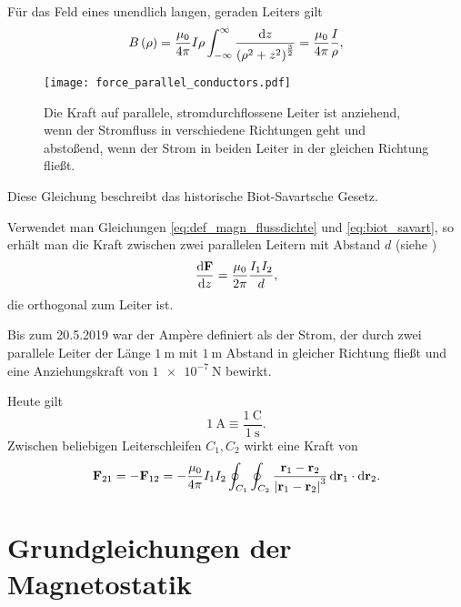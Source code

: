 Für das Feld eines unendlich langen, geraden Leiters gilt
\begin{equation}
	\label{eq:biot_savart}
	B\left(\rho \right)=\frac{\mu _{0}}{4\pi }I\rho \int _{-\infty }^{\infty }\frac{\mathop{}\!\mathrm{d} z}{\left(\rho ^{2}+z^{2}\right)^{\frac{3}{2}}}=\frac{\mu _{0}}{4\pi }\frac{I}{\rho },
\end{equation}


\begin{figure}[htb]
	\centering
	\texttt{[image: force\_parallel\_conductors.pdf]}
	\caption{Die Kraft auf parallele, stromdurchflossene Leiter ist anziehend, wenn der Stromfluss in verschiedene Richtungen geht und abstoßend, wenn der Strom in beiden Leiter in der gleichen Richtung fließt. }
	\label{fig:force_parallel_conductors}
\end{figure}

Diese Gleichung beschreibt das historische Biot-Savartsche Gesetz.

Verwendet man Gleichungen \eqref{eq:def_magn_flussdichte} und \eqref{eq:biot_savart}, so erhält man die Kraft zwischen zwei parallelen Leitern mit Abstand $d$ (siehe )
\begin{equation*}
	\frac{\mathop{}\!\mathrm{d}\mathbf{F}}{\mathop{}\!\mathrm{d} z} = \frac{\mu_0}{2\pi} \frac{I_1I_2}d,
\end{equation*}
die orthogonal zum Leiter ist.

Bis zum 20.5.2019 war der Ampère definiert als der Strom, der durch zwei parallele Leiter der Länge $\SI{1}{\m}$ mit $\SI{1}{\m}$ Abstand in gleicher Richtung fließt und eine Anziehungskraft von $\SI{1e-7}{\newton}$ bewirkt.

Heute gilt
\begin{equation*}
	\SI{1}{\ampere}\equiv \frac{\SI{1}{\coulomb}}{\SI{1}{\s}}.
\end{equation*}
Zwischen beliebigen Leiterschleifen $C_{1},C_{2}$ wirkt eine Kraft von
\begin{equation*}
	\mathbf{F}_{21}=-\mathbf{F}_{12}=-\frac{\mu _{0}}{4\pi }I_{1}I_{2}\oint _{C_{1}}\oint _{C_{2}}\frac{\mathbf{r}_{1}-\mathbf{r}_{2}}{\left| \mathbf{r}_{1}-\mathbf{r}_{2}\right| ^{3}}\mathop{}\!\mathrm{d} \mathbf{r}_{1}\cdot \mathop{}\!\mathrm{d} \mathbf{r}_{2}.
\end{equation*}



\section{Grundgleichungen der Magnetostatik}

